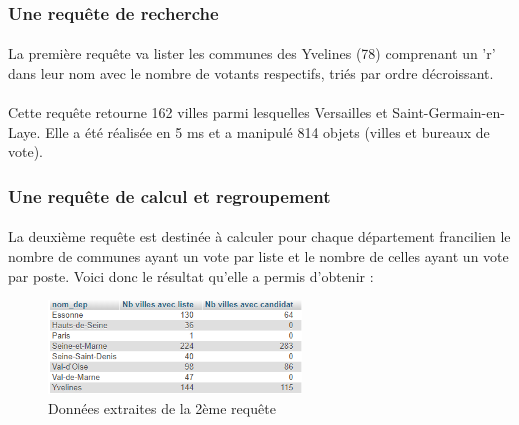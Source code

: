 \subsubsection{Une requête de recherche}
\paragraph{}La première requête va lister les communes des Yvelines (78) comprenant un 'r' dans leur nom avec le nombre de votants respectifs, triés par ordre décroissant.
\paragraph{}Cette requête retourne 162 villes parmi lesquelles Versailles et Saint-Germain-en-Laye. Elle a été réalisée en 5 ms et a manipulé 814 objets (villes et bureaux de vote).

\subsubsection{Une requête de calcul et regroupement}
\paragraph{}La deuxième requête est destinée à calculer pour chaque département francilien le nombre de communes ayant un vote par liste et le nombre de celles ayant un vote par poste. Voici donc le résultat qu'elle a permis d'obtenir :
\begin{figure}[!htp]
  \centering
  \includegraphics[width=0.6\textwidth]{./src_img/req2_sql.png}
  \caption{Données extraites de la 2ème requête}
  \label{fig:req2}
\end{figure}
